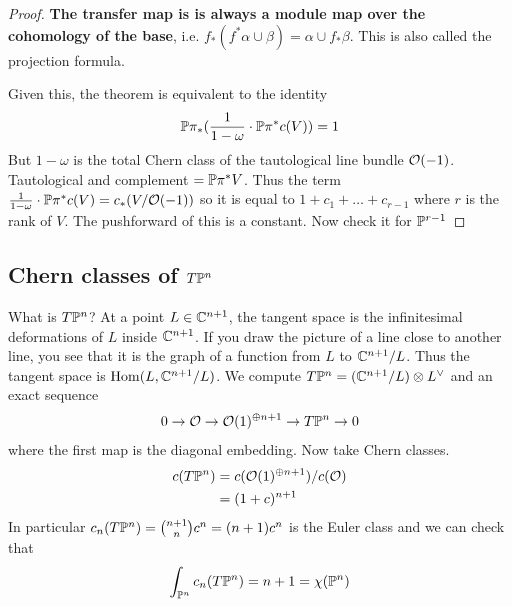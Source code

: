 \documentclass[12pt]{article}
\begin{document}
\begin{proof}
    \textbf{The transfer map is is always a module map over the cohomology of the base}, i.e. $f_*(f^* \alpha \cup \beta) = \alpha \cup f_* \beta$. This is also called the projection formula.

    Given this, the theorem is equivalent to the identity \begin{align*}
        \P\pi_*(\frac{1}{1-\omega} \cdot \P\pi^* c(V)) = 1
    \end{align*} But $1-\omega$ is the total Chern class of the tautological line bundle $\cO(-1)$. Tautological and complement $= \P\pi^* V$. Thus the term $\frac{1}{1-\omega} \cdot \P\pi^* c(V) = c_*(V/\cO(-1))$ so it is equal to $1 + c_1 + \dots + c_{r-1}$ where $r$ is the rank of $V$. The pushforward of this is a constant. Now check it for $\P^{r-1}$
    \end{proof}
    
    \subsection{Chern classes of $T\P^n$}
    What is $T\P^n$? At a point $L\in \C^{n+1}$, the tangent space is the infinitesimal deformations of $L$ inside $\C^{n+1}$. If you draw the picture of a line close to another line, you see that it is the graph of a function from $L$ to $\C^{n+1}/L$. Thus the tangent space is $\Hom(L, \C^{n+1}/L)$.
    We compute $T\P^n = (\C^{n+1}/L) \otimes L^\vee$ and an exact sequence \begin{align*}
        0 \to \cO \to \cO(1)^{\oplus n+1} \to T\P^n \to 0
    \end{align*} where the first map is the diagonal embedding. Now take Chern classes. \begin{align*}
        c(T\P^n) &= c(\cO(1)^{\oplus n+1})/c(\cO) \\
        &= (1+c)^{n+1}
    \end{align*} In particular $c_n (T\P^n) = \binom{n+1}{n} c^n = (n+1) c^n$ is the Euler class and we can check that \begin{align*}
        \int_{\P^n} c_n(T\P^n) = n+1 = \chi(\P^n)
    \end{align*}
\end{document}
